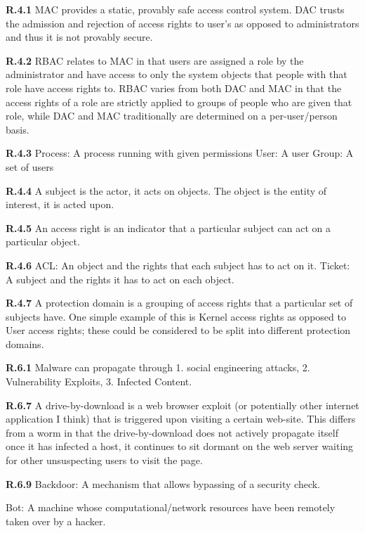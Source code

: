 \documentclass{report}
\begin{document}
{\bf R.4.1} MAC provides a static, provably safe access control system. DAC
trusts the admission and rejection of access rights to user's as opposed to
administrators and thus it is not provably secure.

{\bf R.4.2} RBAC relates to MAC in that users are assigned a role by the
administrator and have access to only the system objects that people with that
role have access rights to. RBAC varies from both DAC and MAC in that the access
rights of a role are strictly applied to groups of people who are given that
role, while DAC and MAC traditionally are determined on a per-user/person basis.

{\bf R.4.3} 
Process: A process running with given permissions
User: A user
Group: A set of users

{\bf R.4.4} A subject is the actor, it acts on objects. The object is the entity
of interest, it is acted upon.

{\bf R.4.5} An access right is an indicator that a particular subject can act on
a particular object.

{\bf R.4.6}
ACL: An object and the rights that each subject has to act on it.
Ticket: A subject and the rights it has to act on each object.

{\bf R.4.7}
A protection domain is a grouping of access rights that a particular set of
subjects have. One simple example of this is Kernel access rights as opposed to
User access rights; these could be considered to be split into different
protection domains.


{\bf R.6.1} Malware can propagate through 1. social engineering attacks, 2.
Vulnerability Exploits, 3. Infected Content.

{\bf R.6.7} A drive-by-download is a web browser exploit (or potentially other
internet application I think) that is triggered upon visiting a certain
web-site. This differs from a worm in that the drive-by-download does not
actively propagate itself once it has infected a host, it continues to sit
dormant on the web server waiting for other unsuspecting users to visit the
page.

{\bf R.6.9} 
Backdoor: A mechanism that allows bypassing of a security check.

Bot: A machine whose computational/network resources have been remotely taken
over by a hacker.
\end{document}
